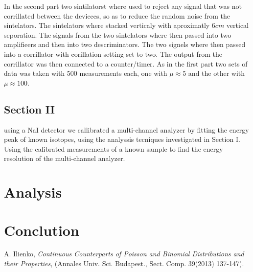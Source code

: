 \documentclass[%
 reprint,
 amsmath,amssymb,
 aps,
]{revtex4-1}
\begin{document}
In the second part two sintilatorst where used to reject any signal that was not corrillated between the devieces, so as to reduce the random noise from the sintelators. The sintelators where stacked verticaly with aproximatly $6cm$ vertical seporation. The signals from the two sintelators where then passed into two amplifieers and then into two descriminators. The two signels where then passed into a corrillator with corillation setting set to two. The output from the corrillator was then connected to a counter/timer. As in the first part two sets of data was taken with 500 measurements each, one with $\mu\approx5$ and the other with $\mu\approx100$.

\subsection{Section II}
using a NaI detector we callibrated a multi-channel analyzer by fitting the energy peak of known isotopes, using the analyssis tecniques investigated in Section I. Using the calibrated measurements of a known sample to find the energy resolution of the multi-channel analyzer.

\section{Analysis}

\section{Conclution}

\begin{thebibliography}{1}

 A. Ilienko, \textit{Continuous Counterparts of Poisson and Binomial Distributions and their Properties}, (Annales Univ. Sci. Budapest., Sect. Comp. 39(2013) 137-147).

\end{thebibliography}
 
\end{document}
